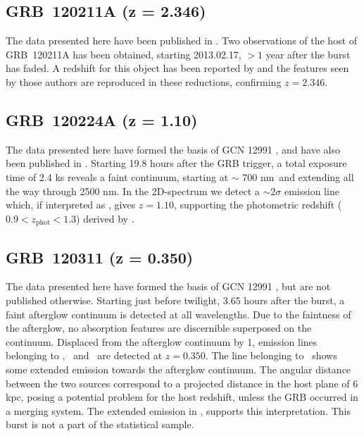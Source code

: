 \documentclass[longauth]{aa}    %
\begin{document}
\subsection{GRB~120211A (z = 2.346)} \label{120211}

The data presented here have been published in \citet{Kruhler2015}. Two
observations of the host of GRB~120211A has been obtained, starting 2013.02.17,
$> 1$ year after the burst has faded. A redshift for this object has been
reported by \citet{Kruhler2015} and the features seen by those authors are
reproduced in these reductions, confirming $z =	2.346$.

\subsection{GRB~120224A (z = 1.10)} \label{120224}

The data presented here have formed the basis of GCN 12991 \citep{GCN12991}, and
have also been published in \citet{Kruhler2015}. Starting 19.8 hours after the
GRB trigger, a total exposure time of 2.4 ks reveals a faint continuum, starting
at $\sim$ 700 nm~and extending all the way through 2500 nm. In the 2D-spectrum
we detect a $\sim 2 \sigma$ emission line which, if interpreted as \ha, gives $z
= 1.10$, supporting the photometric redshift ($0.9 < z_\mathrm{phot} < 1.3$)
derived by \citet{Kruhler2015}.

\subsection{GRB~120311 (z = 0.350)} \label{120311}

The data presented here have formed the basis of GCN 12991 \citep{GCN12991}, but
are not published otherwise. Starting just before twilight, 3.65 hours after the
burst, a faint afterglow continuum is detected at all wavelengths. Due to the
faintness of the afterglow, no absorption features are discernible superposed on
the continuum. Displaced from the afterglow continuum by 1, emission lines
belonging to \hb, \oiii~and \ha~are detected at $z = 0.350$. The line belonging
to \ha~shows some extended emission towards the afterglow continuum. The angular
distance between the two sources correspond to a projected distance in the host
plane of 6 kpc, posing a potential problem for the host redshift, unless the GRB
occurred in a merging system. The extended emission in \ha, supports this
interpretation. This burst is not a part of the statistical sample.
\end{document}
